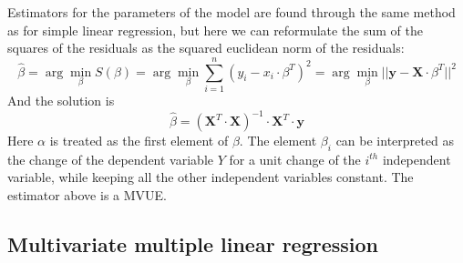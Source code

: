 Estimators for the parameters of the model are found through the same method as for simple linear regression, but here we can reformulate the sum of the squares of the residuals as the squared euclidean norm of the residuals:
\begin{equation*}
    \hat{\beta} = \arg \min_{\beta} S(\beta) = \arg \min_{\beta} \sum_{i=1}^n (y_i - x_i \cdot \beta^T)^2 = \arg \min_{\beta} ||\mathbf{y} - \mathbf{X} \cdot \beta^T||^2
\end{equation*}
And the solution is
\begin{equation*}
    \hat{\beta} = (\mathbf{X}^T \cdot \mathbf{X})^{-1} \cdot \mathbf{X}^T \cdot \mathbf{y}
\end{equation*}
Here $\alpha$ is treated as the first element of $\beta$. The element $\beta_i$ can be interpreted as the change of the dependent variable $Y$ for a unit change of the $i^{th}$ independent variable, while keeping all the other independent variables constant. The estimator above is a MVUE.

\subsection{Multivariate multiple linear regression}

